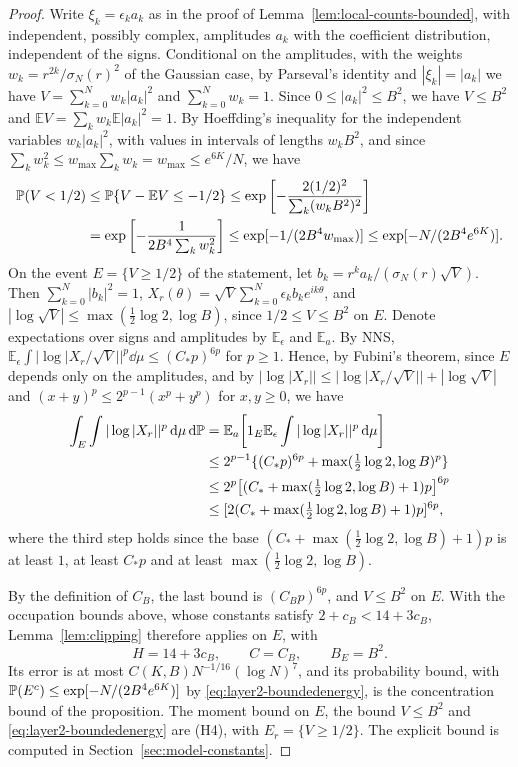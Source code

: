 \begin{proof}
Write $\xi_k=\epsilon_ka_k$ as in the proof of
Lemma~\ref{lem:local-counts-bounded}, with independent, possibly complex,
amplitudes $a_k$ with the coefficient distribution, independent of the
signs.
Conditional on the amplitudes, with the weights
$w_k=r^{2k}/\sigma_N(r)^2$ of the Gaussian case, by Parseval's identity
and $|\xi_k|=|a_k|$ we have $V=\sum_{k=0}^Nw_k|a_k|^2$ and
$\sum_{k=0}^Nw_k=1$.
Since $0\le|a_k|^2\le B^2$, we have $V\le B^2$ and
$\mathbb EV=\sum_kw_k\mathbb E|a_k|^2=1$.
By Hoeffding's inequality for the independent variables $w_k|a_k|^2$,
with values in intervals of lengths $w_kB^2$, and since
$\sum_kw_k^2\le w_{\max}\sum_kw_k=w_{\max}\le e^{6K}/N$, we have
\begin{equation}
 \begin{aligned}
 \mathbb P(V<1/2)&\le\mathbb P\{V-\mathbb EV\le-1/2\}
 \le\exp\left[-\frac{2(1/2)^2}{\sum_k(w_kB^2)^2}\right]\\
 &=\exp\left[-\frac1{2B^4\sum_kw_k^2}\right]
 \le\exp[-1/(2B^4w_{\max})]
 \le\exp[-N/(2B^4e^{6K})].
 \end{aligned}\label{eq:layer2-boundedenergy}
\end{equation}
On the event $E=\{V\ge1/2\}$ of the statement, let
$b_k=r^ka_k/(\sigma_N(r)\sqrt V)$.
Then $\sum_{k=0}^N|b_k|^2=1$,
$X_r(\theta)=\sqrt V\sum_{k=0}^N\epsilon_kb_ke^{ik\theta}$, and
$|\log\sqrt V|\le\max(\tfrac12\log2,\log B)$, since $1/2\le V\le B^2$ on
$E$.
Denote expectations over signs and amplitudes by $\mathbb E_\epsilon$ and
$\mathbb E_a$.
By NNS,
$\mathbb E_\epsilon\int|\log|X_r/\sqrt V||^p\dd\mu\le(C_*p)^{6p}$ for
$p\ge1$. Hence, by Fubini's theorem, since $E$ depends only on the
amplitudes, and by $|\log|X_r||\le|\log|X_r/\sqrt V||+|\log\sqrt V|$ and
$(x+y)^p\le2^{p-1}(x^p+y^p)$ for $x,y\ge0$, we have
\begin{align*}
 \int_{E}\int|\log|X_r||^p\,\mathrm d\mu\,\mathrm d\mathbb P
 &=\mathbb E_a\!\left[1_{E}\mathbb E_\epsilon
                 \int|\log|X_r||^p\,\mathrm d\mu\right]\\
 &\le2^{p-1}\{(C_*p)^{6p}+\max(\tfrac12\log2,\log B)^p\}\\
 &\le2^p\bigl[(C_*+\max(\tfrac12\log2,\log B)+1)p\bigr]^{6p}\\
 &\le[2(C_*+\max(\tfrac12\log2,\log B)+1)p]^{6p},
\end{align*}
where the third step holds since
the base $(C_*+\max(\tfrac12\log2,\log B)+1)p$ is at least $1$,
at least $C_*p$ and at least $\max(\tfrac12\log2,\log B)$.

By the definition of $C_B$, the last bound is $(C_Bp)^{6p}$, and
$V\le B^2$ on $E$.
With the occupation bounds above, whose constants satisfy
$2+c_B<14+3c_B$, Lemma~\ref{lem:clipping} therefore applies on $E$, with
\[
 H=14+3c_B,\qquad C=C_B,\qquad B_E=B^2.
\]
Its error is at most $C(K,B)N^{-1/16}(\log N)^7$, and its probability
bound, with $\mathbb P(E^c)\le\exp[-N/(2B^4e^{6K})]$ by
\eqref{eq:layer2-boundedenergy}, is the concentration bound of the
proposition.
The moment bound on $E$, the bound $V\le B^2$ and
\eqref{eq:layer2-boundedenergy} are (H4), with $E_r=\{V\ge1/2\}$.
The explicit bound is computed in Section~\ref{sec:model-constants}.


\end{proof}
